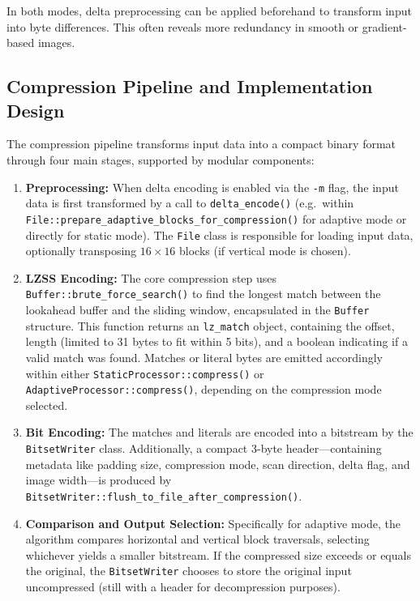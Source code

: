 \documentclass[a4paper,12pt]{article}
\begin{document}
    In both modes, delta preprocessing can be applied beforehand to transform input into byte differences. This often reveals more redundancy in smooth or gradient-based images.

    \subsection*{Compression Pipeline and Implementation Design}

    The compression pipeline transforms input data into a compact binary format through four main stages, supported by modular components:

    \begin{enumerate}
        \item \textbf{Preprocessing:} When delta encoding is enabled via the \texttt{-m} flag, the input data is
        first transformed by a call to
        \texttt{delta\_encode()} (e.g.\ within \\ \texttt{File::prepare\_adaptive\_blocks\_for\_compression()} for adaptive mode or directly for static mode). The \texttt{File} class is responsible for loading input data, optionally transposing $16\times16$ blocks (if vertical mode is chosen).

        \item \textbf{LZSS Encoding:} The core compression step uses \texttt{Buffer::brute\_force\_search()} to find the longest match between the lookahead buffer and the sliding window, encapsulated in the \texttt{Buffer} structure. This function returns an \texttt{lz\_match} object, containing the offset, length (limited to 31 bytes to fit within 5 bits), and a boolean indicating if a valid match was found. Matches or literal bytes are emitted accordingly within either \texttt{StaticProcessor::compress()} or \texttt{AdaptiveProcessor::compress()}, depending on the compression mode selected.

        \item \textbf{Bit Encoding:} The matches and literals are encoded into a bitstream by the \texttt{BitsetWriter} class. Additionally, a compact 3-byte header—containing metadata like padding size, compression mode, scan direction, delta flag, and image width—is produced by \texttt{BitsetWriter::flush\_to\_file\_after\_compression()}.

        \item \textbf{Comparison and Output Selection:} Specifically for adaptive mode, the algorithm compares
        horizontal and vertical block traversals, selecting whichever yields a smaller bitstream. If the compressed
        size exceeds or equals the original, the \texttt{BitsetWriter} chooses to store the original input
        uncompressed (still with a header for decompression purposes).
    \end{enumerate}
\end{document}
